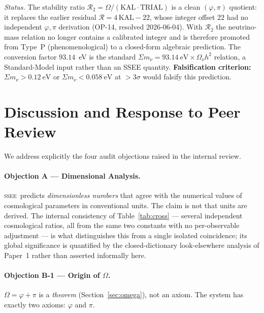 \documentclass[12pt,a4paper]{article}
\newcommand{\SSEE}{\ifmmode\mathrm{SSEE}\else\textsc{ssee}\fi}
\begin{document}
\emph{Status.} The stability ratio $\mathcal{R}_2=\Omega/(\mathrm{KAL}\cdot\mathrm{TRIAL})$
is a clean $(\varphi,\pi)$ quotient: it replaces the earlier residual
$\mathcal{R}=4\,\mathrm{KAL}-22$, whose integer offset $22$ had no independent
$\varphi,\pi$ derivation (OP-14, resolved 2026-06-04). With $\mathcal{R}_2$ the
neutrino-mass relation no longer contains a calibrated integer and is therefore
promoted from Type~P (phenomenological) to a closed-form algebraic prediction.
The conversion factor $93.14$~eV is the standard $\Sigma m_\nu=93.14~\mathrm{eV}\times
\Omega_\nu h^2$ relation, a Standard-Model input rather than an SSEE quantity.
\textbf{Falsification criterion:} $\Sigma m_\nu > 0.12~\mathrm{eV}$ or
$\Sigma m_\nu < 0.058~\mathrm{eV}$ at $>3\sigma$ would falsify this prediction.

\section{Discussion and Response to Peer Review}
\label{sec:discussion}

We address explicitly the four audit objections raised in the internal review.

\paragraph{Objection A — Dimensional Analysis.}
\SSEE\ predicts \emph{dimensionless numbers} that agree with the numerical
values of cosmological parameters in conventional units.
The claim is not that units are derived.
The internal consistency of Table~\ref{tab:cross} — several independent
cosmological ratios, all from the same two constants with no per-observable
adjustment — is what distinguishes this from a single isolated coincidence;
its global significance is quantified by the closed-dictionary look-elsewhere
analysis of Paper~1 rather than asserted informally here.

\paragraph{Objection B-1 — Origin of $\Omega$.}
$\Omega = \varphi+\pi$ is a \emph{theorem} (Section~\ref{sec:omega}),
not an axiom.  The system has exactly two axioms: $\varphi$ and $\pi$.
\end{document}
